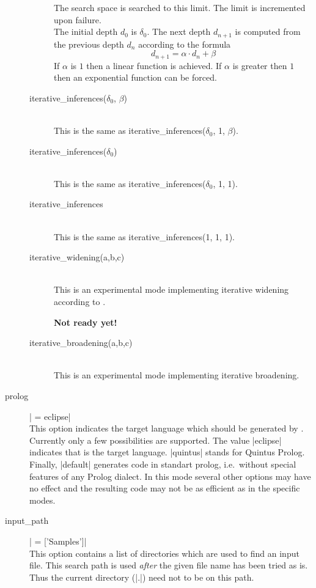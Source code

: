 \begin{description}
\begin{description}
		The search space is searched to this limit. The limit is
		incremented upon failure.
		\\
		The initial depth $d_0$\/ is $\delta_0$.
		The next depth $d_{n+1}$\/ is computed from the previous depth
		$d_n$\/ according to the formula
		\[ d_{n+1} = \alpha\cdot d_n + \beta
		\]
		If $\alpha$\/ is $1$\/ then a linear function is achieved. If
		$\alpha$\/ is greater then $1$\/ then an exponential function
		can be forced.
	  \item [iterative\_inferences($\delta_0$, $\beta$)]\ \\
	        This is the same as 
		iterative\_inferences($\delta_0$, 1, $\beta$).
	  \item [iterative\_inferences($\delta_0$)]\ \\
	        This is the same as iterative\_inferences($\delta_0$, 1, 1).
	  \item [iterative\_inferences]\ \\
	        This is the same as iterative\_inferences(1, 1, 1).
	  \item [iterative\_widening(a,b,c)]\ \\
		This is an experimental mode implementing iterative widening
		according to \cite{ginsberg.harvey:iterative}.

		{\bf Not ready yet!}
	  \item [iterative\_broadening(a,b,c)]\ \\
		This is an experimental mode implementing iterative
		broadening. 
	\end{description}

  \item [prolog] | = eclipse|\label{opt:prolog}\\
	This option indicates the target language which should be
	generated by \ProCom. Currently only a few possibilities are
	supported. The value |eclipse| indicates that \eclipse{} is
	the target language.  |quintus| stands for Quintus
	Prolog. Finally, |default| generates code in standart prolog,
	i.e.\ without special features of any Prolog dialect. In this
	mode several other options may have no effect and the
	resulting code may not be as efficient as in the specific
	modes.

  \item [input\_path] | = ['Samples']|\\
	This option contains a list of directories which are used to find an
	input file. This search path is used {\em after} the given file name
	has been tried as is. Thus the current directory (|.|) need not to be
	on this path.


\end{description}
